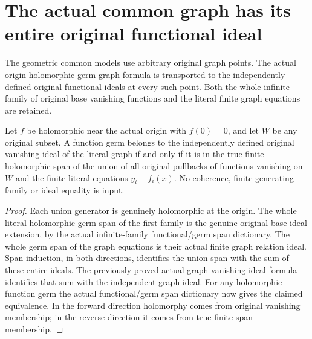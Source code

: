 \section{The actual common graph has its entire original functional ideal}

The geometric common models use arbitrary original graph points. The actual
origin holomorphic-germ graph formula is transported to the independently
defined original functional ideals at every such point. Both the whole
infinite family of original base vanishing functions and the literal finite
graph equations are retained.

\begin{theorem}
\label{hir:actual-graph-functional-ideal-origin}
\leanok
Let $f$ be holomorphic near the actual origin with $f(0)=0$, and let $W$
be any original subset. A function germ belongs to the independently defined
original vanishing ideal of the literal graph if and only if it is in the
true finite holomorphic span of the union of all original pullbacks of
functions vanishing on $W$ and the finite literal equations $y_i-f_i(x)$.
No coherence, finite generating family or ideal equality is input.
\end{theorem}
\begin{proof}
Each union generator is genuinely holomorphic at the origin. The whole
literal holomorphic-germ span of the first family is the genuine original
base ideal extension, by the actual infinite-family functional/germ span
dictionary. The whole germ span of the graph equations is their actual
finite graph relation ideal. Span induction, in both directions, identifies
the union span with the sum of these entire ideals. The previously proved
actual graph vanishing-ideal formula identifies that sum with the independent
graph ideal. For any holomorphic function germ the actual functional/germ
span dictionary now gives the claimed equivalence. In the forward direction
holomorphy comes from original vanishing membership; in the reverse direction
it comes from true finite span membership.
\end{proof}

